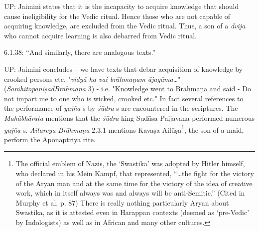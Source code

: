\newpage

UP: Jaimini states that it is the incapacity to acquire knowledge that should cause ineligibility for the Vedic ritual. Hence those who are not capable of acquiring knowledge, are excluded from the Vedic ritual. Thus, a son of a \textit{dvija }who cannot acquire learning is also debarred from Vedic ritual.

6.1.38: “And similarly, there are analogous texts.”

UP: Jaimini concludes – we have texts that debar acquisition of knowledge by crooked persons etc. "\textit{vidyā ha vai brāhmaṇam ājagāma}…" (\textit{SaṁhitopaniṣadBrāhmaṇa} 3) - i.e. "Knowledge went to Brāhmaṇa and said - Do not impart me to one who is wicked, crooked etc." In fact several references to the performance of \textit{yajña}-s by \textit{śūdra}-s are encountered in the scriptures. The \textit{Mahābhārata} mentions that the \textit{śūdra} king Sudāsa Paijavana performed numerous \textit{yajña}-s. \textit{Aitareya Brāhmaṇa} 2.3.1 mentions Kavaṣa Ailūṣa\footnote{ The official emblem of Nazis, the ‘Swastika’ was adopted by Hitler himself, who declared in his Mein Kampf, that represented, “…the fight for the victory of the Aryan man and at the same time for the victory of the idea of creative work, which in itself always was and always will be anti-Semitic.” (Cited in Murphy et al, p. 87) There is really nothing particularly Aryan about Swastika, as it is attested even in Harappan contexts (deemed as ‘pre-Vedic’ by Indologists) as well as in African and many other cultures.}, the son of a maid, perform the Āponaptriya rite.

